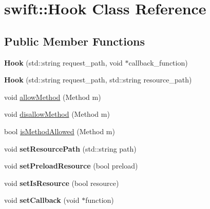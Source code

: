 \hypertarget{classswift_1_1_hook}{\section{swift\-:\-:Hook Class Reference}
\label{classswift_1_1_hook}
}
\subsection*{Public Member Functions}
\begin{DoxyCompactItemize}
\item 
\hypertarget{classswift_1_1_hook_aa394cd0e3d904efc13d1ec68f7fecb75}{{\bfseries Hook} (std\-::string request\-\_\-path, void $\ast$callback\-\_\-function)}\label{classswift_1_1_hook_aa394cd0e3d904efc13d1ec68f7fecb75}

\item 
\hypertarget{classswift_1_1_hook_a08e8c205418d4dc95a24ad10f0a6754e}{{\bfseries Hook} (std\-::string request\-\_\-path, std\-::string resource\-\_\-path)}\label{classswift_1_1_hook_a08e8c205418d4dc95a24ad10f0a6754e}

\item 
void \hyperlink{classswift_1_1_hook_ab8f2a030f4234be5aaea657628414669}{allow\-Method} (Method m)
\item 
void \hyperlink{classswift_1_1_hook_a02148f71598a14eb8c7f42d9c82f50cb}{disallow\-Method} (Method m)
\item 
bool \hyperlink{classswift_1_1_hook_ad5e71e832b6290d4f195a5dcd594e661}{is\-Method\-Allowed} (Method m)
\item 
\hypertarget{classswift_1_1_hook_a4147575b0d54691515271508baa428c8}{void {\bfseries set\-Resource\-Path} (std\-::string path)}\label{classswift_1_1_hook_a4147575b0d54691515271508baa428c8}

\item 
\hypertarget{classswift_1_1_hook_a8fc8a844df53bc651a46f9616ee635f9}{void {\bfseries set\-Preload\-Resource} (bool preload)}\label{classswift_1_1_hook_a8fc8a844df53bc651a46f9616ee635f9}

\item 
\hypertarget{classswift_1_1_hook_aeefe2c2e5080787975097a7c1b431161}{void {\bfseries set\-Is\-Resource} (bool resource)}\label{classswift_1_1_hook_aeefe2c2e5080787975097a7c1b431161}

\item 
\hypertarget{classswift_1_1_hook_ad7bcbc0360bf438cef8eac374919495d}{void {\bfseries set\-Callback} (void $\ast$function)}\label{classswift_1_1_hook_ad7bcbc0360bf438cef8eac374919495d}

\end{DoxyCompactItemize}


